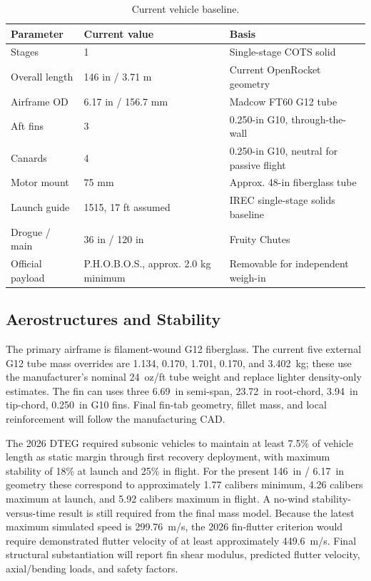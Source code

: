 \documentclass[10pt]{article}
\newcommand{\PHOBOS}{P.H.O.B.O.S.}
\begin{document}
\begin{table}[ht]
\centering
\caption{Current vehicle baseline.}
\begin{tabularx}{\linewidth}{@{}l l X@{}}
\toprule
\textbf{Parameter} & \textbf{Current value} & \textbf{Basis} \\
\midrule
Stages & 1 & Single-stage COTS solid \\
Overall length & 146 in / 3.71 m & Current OpenRocket geometry \\
Airframe OD & 6.17 in / 156.7 mm & Madcow FT60 G12 tube \\
Aft fins & 3 & 0.250-in G10, through-the-wall \\
Canards & 4 & 0.250-in G10, neutral for passive flight \\
Motor mount & 75 mm & Approx. 48-in fiberglass tube \\
Launch guide & 1515, 17 ft assumed & IREC single-stage solids baseline \\
Drogue / main & 36 in / 120 in & Fruity Chutes \\
Official payload & \PHOBOS{}, approx. 2.0 kg minimum & Removable for independent weigh-in \\
\bottomrule
\end{tabularx}
\end{table}

\subsection{Aerostructures and Stability}
The primary airframe is filament-wound G12 fiberglass. The current five external G12 tube mass overrides are 1.134, 0.170, 1.701, 0.170, and \SI{3.402}{kg}; these use the manufacturer's nominal \SI{24}{oz/ft} tube weight and replace lighter density-only estimates. The fin can uses three \SI{6.69}{in} semi-span, \SI{23.72}{in} root-chord, \SI{3.94}{in} tip-chord, \SI{0.250}{in} G10 fins. Final fin-tab geometry, fillet mass, and local reinforcement will follow the manufacturing CAD.

The 2026 DTEG required subsonic vehicles to maintain at least 7.5\% of vehicle length as static margin through first recovery deployment, with maximum stability of 18\% at launch and 25\% in flight. For the present \SI{146}{in} / \SI{6.17}{in} geometry these correspond to approximately 1.77 calibers minimum, 4.26 calibers maximum at launch, and 5.92 calibers maximum in flight. A no-wind stability-versus-time result is still required from the final mass model. Because the latest maximum simulated speed is \SI{299.76}{m/s}, the 2026 fin-flutter criterion would require demonstrated flutter velocity of at least approximately \SI{449.6}{m/s}. Final structural substantiation will report fin shear modulus, predicted flutter velocity, axial/bending loads, and safety factors.
\end{document}
